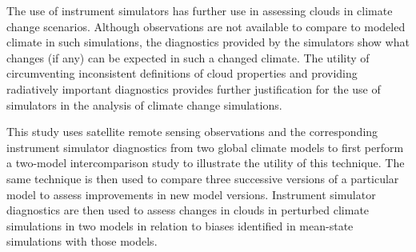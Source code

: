The use of instrument simulators has further use in assessing clouds in climate change scenarios. Although observations are not available to compare to modeled climate in such simulations, the diagnostics provided by the simulators show what changes (if any) can be expected in such a changed climate. The utility of circumventing inconsistent definitions of cloud properties and providing radiatively important diagnostics provides further justification for the use of simulators in the analysis of climate change simulations.

This study uses satellite remote sensing observations and the corresponding instrument simulator diagnostics from two global climate models to first perform a two-model intercomparison study to illustrate the utility of this technique. The same technique is then used to compare three successive versions of a particular model to assess improvements in new model versions. Instrument simulator diagnostics are then used to assess changes in clouds in perturbed climate simulations in two models in relation to biases identified in mean-state simulations with those models.
